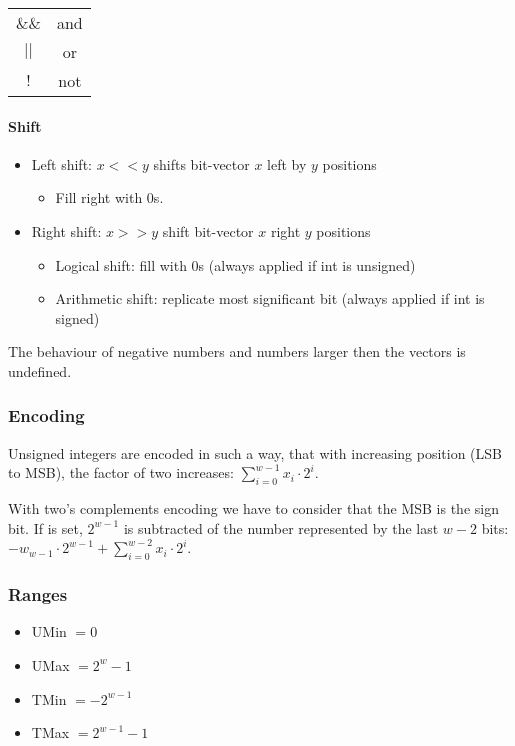 \begin{tabular}{c | c}
    $\&\&$ & and\\
    $||$ & or\\
    $!$ & not
\end{tabular}

\paragraph{Shift}
\begin{itemize}
    \item Left shift: $x << y$ shifts bit-vector $x$ left by $y$ positions
        \begin{itemize}
            \item Fill right with $0$s.
        \end{itemize}
    \item Right shift: $x >> y$ shift bit-vector $x$ right $y$ positions
        \begin{itemize}
            \item Logical shift: fill with $0$s (always applied if int is unsigned)
            \item Arithmetic shift: replicate most significant bit (always applied if int is signed)
        \end{itemize}
\end{itemize}

The behaviour of negative numbers and numbers larger then the vectors is undefined.

\subsubsection{Encoding}
Unsigned integers are encoded in such a way, that with increasing position (LSB to MSB), the factor of two increases: $\sum_{i=0}^{w-1} x_i \cdot 2^i$.

With two's complements encoding we have to consider that the MSB is the sign bit. If is set, $2^{w-1}$ is subtracted of the number represented by the last $w-2$ bits: $-w_{w - 1} \cdot 2^{w - 1} + \sum_{i=0}^{w - 2} x_i \cdot 2^i$.

\subsubsection{Ranges}
\begin{itemize}
    \item UMin $= 0$
    \item UMax $= 2^w -1$
    \item TMin $=-2^{w - 1}$
    \item TMax $=2^{w-1} - 1$
\end{itemize}


